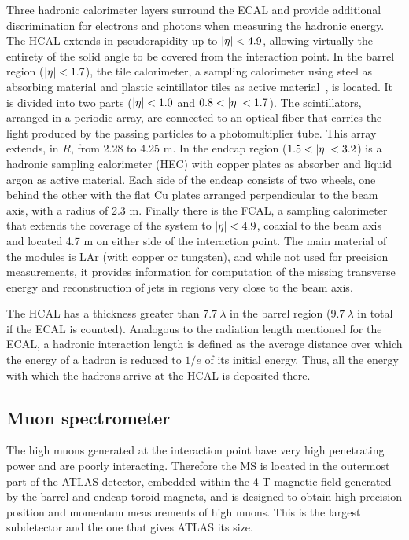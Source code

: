Three hadronic calorimeter layers surround the \ac{ECAL} and provide additional discrimination for electrons and photons when measuring the hadronic energy. The \ac{HCAL} extends in pseudorapidity up to \(|\eta|<4.9\), allowing virtually the entirety of the solid angle to be covered from the interaction point. In the barrel region (\(|\eta|<1.7\)), the tile calorimeter, a sampling calorimeter using steel as absorbing material and plastic scintillator tiles as active material~\cite{TileTDR}, is located. It is divided into two parts (\(|\eta|<1.0\) and \(0.8<\abseta<1.7\)). The scintillators, arranged in a periodic array, are connected to an optical fiber that carries the light produced by the passing particles to a photomultiplier tube. This array extends, in \(R\), from 2.28 to 4.25 m. In the endcap region (\(1.5<\abseta<3.2\)) is a hadronic sampling calorimeter (HEC) with copper plates as absorber and liquid argon as active material. Each side of the endcap consists of two wheels, one behind the other with the flat Cu plates arranged perpendicular to the beam axis, with a radius of 2.3 m. Finally there is the \ac{FCAL}, a sampling calorimeter that extends the coverage of the system to \(|\eta|<4.9\), coaxial to the beam axis and located 4.7 m on either side of the interaction point. The main material of the modules is \ac{LAr} (with copper or tungsten), and while not used for precision measurements, it provides information for computation of the missing transverse energy and reconstruction of jets in regions very close to the beam axis.

The \ac{HCAL} has a thickness greater than \(7.7~\lambda\) in the barrel region (\(9.7~\lambda\) in total if the \ac{ECAL} is counted). Analogous to the radiation length mentioned for the \ac{ECAL}, a hadronic interaction length is defined as the average distance over which the energy of a hadron is reduced to \(1/e\) of its initial energy. Thus, all the energy with which the hadrons arrive at the \ac{HCAL} is deposited there.





\subsection{Muon spectrometer}

The high \pt muons generated at the interaction point have very high penetrating power and are poorly interacting. Therefore the \ac{MS} \cite{MuonTDR} is located in the outermost part of the \ac{ATLAS} detector, embedded within the 4 T magnetic field generated by the barrel and endcap toroid magnets, and is designed to obtain high precision position and momentum measurements of high \pt muons. This is the largest subdetector and the one that gives \ac{ATLAS} its size.


